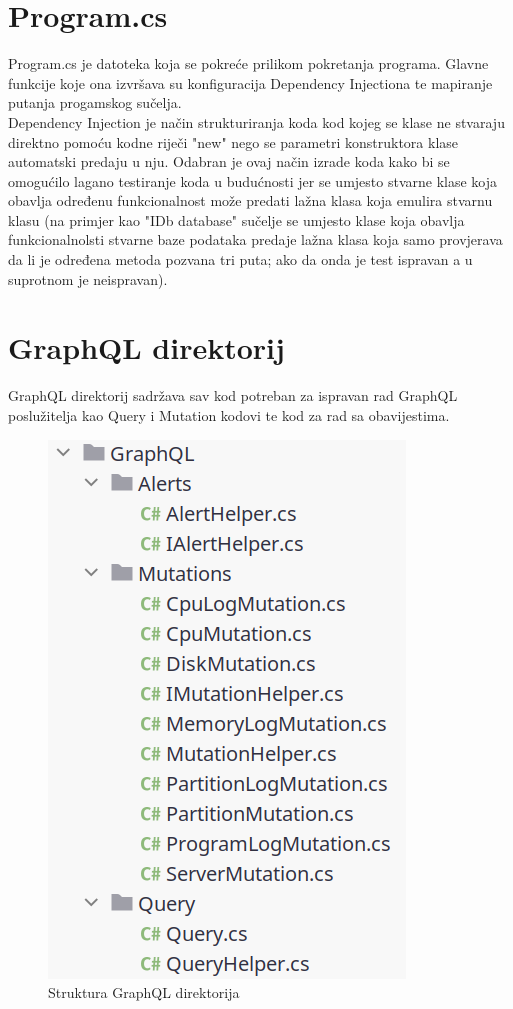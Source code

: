 \documentclass[zavrsnirad]{fer}
\begin{document}
\section{Program.cs}
Program.cs je datoteka koja se pokreće prilikom pokretanja programa. Glavne funkcije koje ona izvršava su konfiguracija Dependency Injectiona te mapiranje putanja progamskog sučelja.
\\Dependency Injection je način strukturiranja koda kod kojeg se klase ne stvaraju direktno pomoću kodne riječi "new" nego se parametri konstruktora klase automatski predaju u nju. Odabran je ovaj način izrade koda kako bi se omogućilo lagano testiranje koda u budućnosti jer se umjesto stvarne klase koja obavlja određenu funkcionalnost može predati lažna klasa koja emulira stvarnu klasu (na primjer kao "IDb database" sučelje se umjesto klase koja obavlja funkcionalnolsti stvarne baze podataka predaje lažna klasa koja samo provjerava da li je određena metoda pozvana tri puta; ako da onda je test ispravan a u suprotnom je neispravan).

\section{GraphQL direktorij}
\label{pog:graphql_dir}
GraphQL direktorij sadržava sav kod potreban za ispravan rad GraphQL poslužitelja kao Query i Mutation kodovi te kod za rad sa obavijestima.

\begin{figure}[htb!]
	\centering
	\includegraphics[width=0.5\linewidth]{images/graphql_dir_structure.png} 
	\caption{Struktura GraphQL direktorija}
\label{slk:graphql_dir_structure}
\end{figure}
\FloatBarrier
\end{document}
